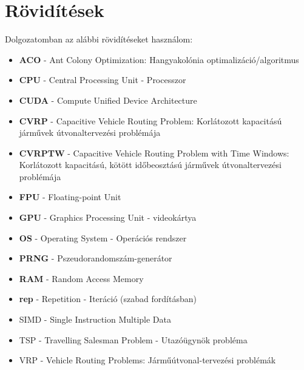 \section{Rövidítések}
Dolgozatomban az alábbi rövidítéseket használom:
\begin{itemize}
	\item \textbf{ACO} - Ant Colony Optimization: Hangyakolónia optimalizáció/algoritmus
	
	\item \textbf{CPU} - Central Processing Unit - Processzor
	\item \textbf{CUDA} - Compute Unified Device Architecture \cite{CUDAdoc}
	\item \textbf{CVRP} - Capacitive Vehicle Routing Problem: Korlátozott kapacitású járművek útvonaltervezési problémája
	\item \textbf{CVRPTW} - Capacitive Vehicle Routing Problem with Time Windows: Korlátozott kapacitású, kötött időbeosztású járművek útvonaltervezési problémája
	\item \textbf{FPU} - Floating-point Unit
	\item \textbf{GPU} - Graphics Processing Unit - videokártya
	\item \textbf{OS} - Operating System - Operációs rendszer
	\item \textbf{PRNG} - Pszeudorandomszám-generátor
	\item \textbf{RAM} - Random Access Memory
	\item \textbf{rep} - Repetition - Iteráció (szabad fordításban)
	\item SIMD - Single Instruction Multiple Data
	\item TSP - Travelling Salesman Problem - Utazóügynök probléma
	\item VRP - Vehicle Routing Problems: Járműútvonal-tervezési problémák 
\end{itemize}




